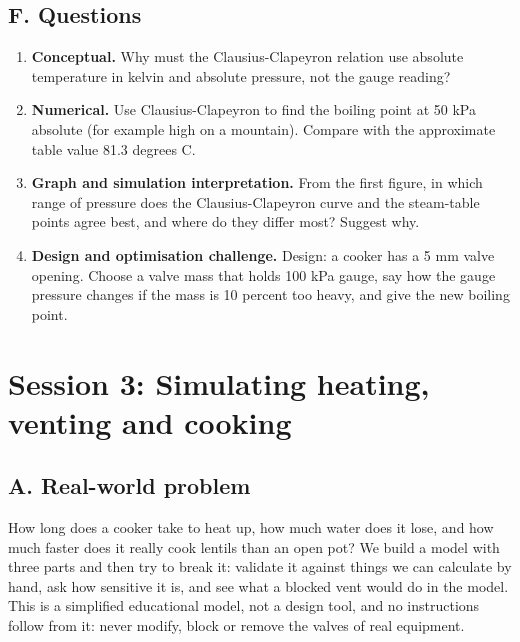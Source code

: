 \documentclass[11pt,a4paper]{article}
\begin{document}
\subsection*{F. Questions}
\begin{enumerate}[nosep]
\item \textbf{Conceptual.} Why must the Clausius-Clapeyron relation use absolute temperature in kelvin and absolute pressure, not the gauge reading?
\item \textbf{Numerical.} Use Clausius-Clapeyron to find the boiling point at 50 kPa absolute (for example high on a mountain). Compare with the approximate table value 81.3 degrees C.
\item \textbf{Graph and simulation interpretation.} From the first figure, in which range of pressure does the Clausius-Clapeyron curve and the steam-table points agree best, and where do they differ most? Suggest why.
\item \textbf{Design and optimisation challenge.} Design: a cooker has a 5 mm valve opening. Choose a valve mass that holds 100 kPa gauge, say how the gauge pressure changes if the mass is 10 percent too heavy, and give the new boiling point.
\end{enumerate}

\section{Session 3: Simulating heating, venting and cooking}

\subsection*{A. Real-world problem}
How long does a cooker take to heat up, how much water does it lose, and how much faster does it really cook lentils than an open pot? We build a model with three parts and then try to break it: validate it against things we can calculate by hand, ask how sensitive it is, and see what a blocked vent would do in the model. This is a simplified educational model, not a design tool, and no instructions follow from it: never modify, block or remove the valves of real equipment.
\end{document}
